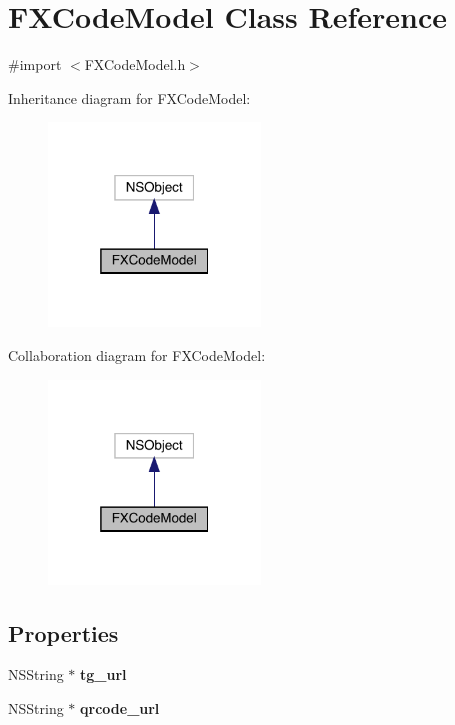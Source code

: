 \hypertarget{interface_f_x_code_model}{}\section{F\+X\+Code\+Model Class Reference}
\label{interface_f_x_code_model}


{\ttfamily \#import $<$F\+X\+Code\+Model.\+h$>$}



Inheritance diagram for F\+X\+Code\+Model\+:\nopagebreak
\begin{figure}[H]
\begin{center}
\leavevmode
\includegraphics[width=160pt]{interface_f_x_code_model__inherit__graph}
\end{center}
\end{figure}


Collaboration diagram for F\+X\+Code\+Model\+:\nopagebreak
\begin{figure}[H]
\begin{center}
\leavevmode
\includegraphics[width=160pt]{interface_f_x_code_model__coll__graph}
\end{center}
\end{figure}
\subsection*{Properties}
\begin{DoxyCompactItemize}
\item 
\mbox{\label{interface_f_x_code_model_a9dd3739cd54ecb80d44cd96f4eb12810}} 
N\+S\+String $\ast$ {\bfseries tg\+\_\+url}
\item 
\mbox{\label{interface_f_x_code_model_a1dbaaaca8cb3ddb8478c440cf36db681}} 
N\+S\+String $\ast$ {\bfseries qrcode\+\_\+url}
\end{DoxyCompactItemize}


